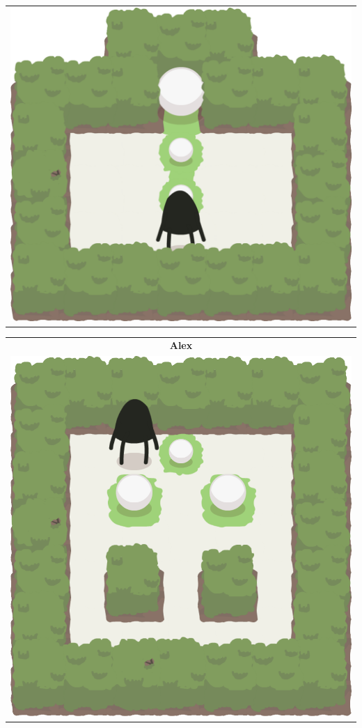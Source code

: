 \documentclass{report}
\theoremstyle{plain}
\begin{document}
\begin{center}
\begin{tabular}{c}
\includegraphics[scale=\levelAnnexWidth]{chris-1.png}
\end{tabular}
\begin{tabular}{c}
\textbf{Alex} \\
\includegraphics[scale=\levelAnnexWidth]{alex-1.png}

\end{tabular}
\end{center}
\end{document}
